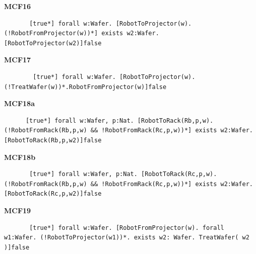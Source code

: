 \documentclass[12pt]{report}
\begin{document}
    \textbf{MCF16}
    \begin{lstlisting}
       [true*] forall w:Wafer. [RobotToProjector(w). (!RobotFromProjector(w))*] exists w2:Wafer. [RobotToProjector(w2)]false
    \end{lstlisting}

    \textbf{MCF17}
    \begin{lstlisting}
        [true*] forall w:Wafer. [RobotToProjector(w). (!TreatWafer(w))*.RobotFromProjector(w)]false
    \end{lstlisting}

    \textbf{MCF18a}
    \begin{lstlisting}
      [true*] forall w:Wafer, p:Nat. [RobotToRack(Rb,p,w).(!RobotFromRack(Rb,p,w) && !RobotFromRack(Rc,p,w))*] exists w2:Wafer. [RobotToRack(Rb,p,w2)]false
    \end{lstlisting}
    
    \textbf{MCF18b}
    \begin{lstlisting}
       [true*] forall w:Wafer, p:Nat. [RobotToRack(Rc,p,w).(!RobotFromRack(Rb,p,w) && !RobotFromRack(Rc,p,w))*] exists w2:Wafer.[RobotToRack(Rc,p,w2)]false
    \end{lstlisting}

    \textbf{MCF19}
    \begin{lstlisting}
       [true*] forall w:Wafer. [RobotFromProjector(w). forall w1:Wafer. (!RobotToProjector(w1))*. exists w2: Wafer. TreatWafer( w2 )]false
       \end{lstlisting}
\end{document}
